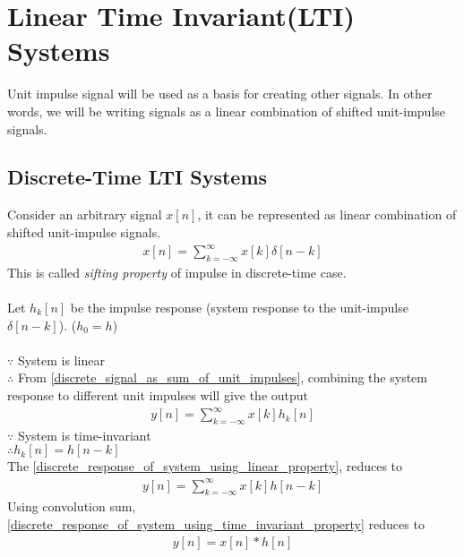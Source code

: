 \documentclass[oneside]{book}
\begin{document}
\section{Linear Time Invariant(LTI) Systems}
Unit impulse signal will be used as a basis for creating other signals. In other words, we will be writing signals as a linear combination of shifted unit-impulse signals.
\subsection{Discrete-Time LTI Systems}
Consider an arbitrary signal $x[n]$, it can be represented as linear combination of shifted unit-impulse signals.
\begin{align}
	x[n] = \sum\limits_{k = -\infty}^{\infty}x[k]\delta[n-k]
	\label{discrete_signal_as_sum_of_unit_impulses}
\end{align}
This is called \textit{sifting property} of impulse in discrete-time case.
\\\\
\noindent Let $h_k[n]$ be the impulse response (system response to the unit-impulse $\delta[n - k]$). ($h_0 = h$)\\\\
\noindent\(\because\) System is linear\\
\(\therefore\) From \cref{discrete_signal_as_sum_of_unit_impulses}, combining the system response to different unit impulses will give the output
\begin{align}
	y[n] = \sum\limits_{k = -\infty}^{\infty}x[k]h_k[n]
	\label{discrete_response_of_system_using_linear_property}
\end{align}
\noindent\(\because\) System is time-invariant\\
\(\therefore h_k[n] = h[n-k]\)\\
The \cref{discrete_response_of_system_using_linear_property}, reduces to
\begin{align}
	y[n] = \sum\limits_{k = -\infty}^{\infty}x[k]h[n-k]
	\label{discrete_response_of_system_using_time_invariant_property}
\end{align}
Using convolution sum\cite{convolution_wiki}, \cref{discrete_response_of_system_using_time_invariant_property} reduces to
\begin{align*}
	y[n] = x[n]*h[n]
\end{align*}
\end{document}

